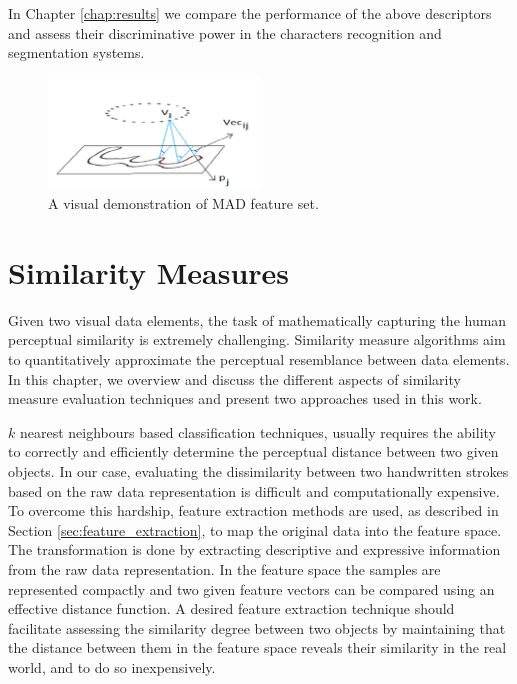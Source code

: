 In Chapter \ref{chap:results} we compare the performance of the above descriptors and assess their discriminative power in the characters recognition and segmentation systems. 

\begin{figure}[h]
\centering
\includegraphics[width=0.5\textwidth]{./figures/mad_demo}       
\caption{A visual demonstration of MAD feature set.}
\label{fig:mad_demo}
\end{figure}
\newpage{}

\section{Similarity Measures}
\label{sec:similarity_measures}

\iftoggle{edit-mode}{\hspace{0pt}\marginpar{Introduction}}{}
Given two visual data elements, the task of mathematically capturing the human perceptual similarity is extremely challenging. Similarity measure algorithms aim to quantitatively approximate the perceptual resemblance between data elements. In this chapter, we overview and discuss the different aspects of similarity measure evaluation techniques and present two approaches used in this work.

\iftoggle{edit-mode}{\hspace{0pt}\marginpar{Intuition}}{}
$k$ nearest neighbours based classification techniques, usually requires the ability to correctly and efficiently determine the perceptual distance between two given objects.
In our case, evaluating the dissimilarity between two handwritten strokes based on the raw data representation is difficult and computationally expensive. 
To overcome this hardship, feature extraction methods are used, as described in Section \ref{sec:feature_extraction}, to map the original data into the feature space. 
The transformation is done by extracting descriptive and expressive information from the raw data representation. 
In the feature space the samples are represented compactly and two given feature vectors can be compared using an effective distance function. A desired feature extraction technique should facilitate assessing the similarity degree between two objects by maintaining that the distance between them in the feature space reveals their similarity in the real world, and to do so inexpensively. 

